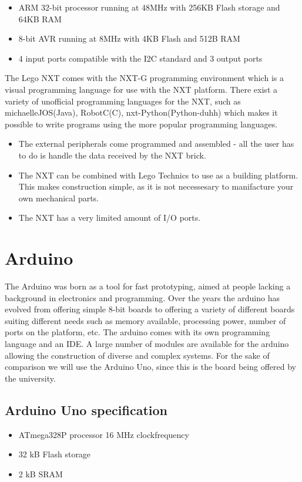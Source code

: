 \begin{itemize}
  \item ARM 32-bit processor running at 48MHz with 256KB Flash storage and 64KB RAM
  \item 8-bit AVR running at 8MHz with 4KB Flash and 512B RAM
  \item 4 input ports compatible with the I2C standard and 3 output ports
\end{itemize}

The Lego NXT comes with the NXT-G programming environment which is a visual
programming language for use with the NXT platform. There exist a variety of
unofficial programming languages for the NXT, such as michael{leJOS(Java), RobotC(C), nxt-Python(Python-duhh)}
which makes it possible to write programs using the more popular programming languages.

\begin{itemize}
  \item The external peripherals come programmed and assembled - all the user
  has to do is handle the data received by the NXT brick.
  \item The NXT can be combined with Lego Technics to use as a building
  platform. This makes construction simple, as it is not necessesary to
  manifacture your own mechanical parts.
  \item The NXT has a very limited amount of I/O ports.
\end{itemize}

\section{Arduino}
The Arduino was born as a tool for fast prototyping, aimed at people lacking a
background in electronics and programming. Over the years the arduino has
evolved from offering simple 8-bit boards to offering a variety of different
boards suiting different needs such as memory available, processing power,
number of ports on the platform, etc. The arduino comes with its own
programming language and an IDE. A large number of modules are available for
the arduino allowing the construction of diverse and complex systems\Source. For the sake
of comparison we will use the Arduino Uno, since this is the board being offered by
the university.

\subsection{Arduino Uno specification}
\begin{itemize}
  \item ATmega328P processor 16 MHz clockfrequency
  \item 32 kB Flash storage
  \item 2 kB SRAM
\end{itemize}

